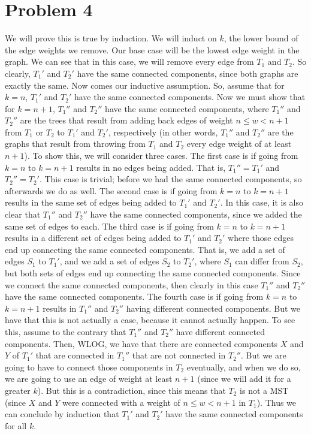\documentclass{article}
\begin{document}
\section*{Problem 4}
We will prove this is true by induction. We will induct on $k$, the lower
bound of the edge weights we remove. Our base case will be the lowest edge
weight in the graph. We can see that in this case, we will remove every
edge from $T_1$ and $T_2$. So clearly, $T_1'$ and $T_2'$ have the same
connected components, since both graphs are exactly the same. Now comes our
inductive assumption. So, assume that for $k = n$, $T_1'$ and $T_2'$ have
the same connected components. Now we must show that for $k = n+1$,
$T_1''$ and $T_2''$ have the same connected components, where $T_1''$ and
$T_2''$ are the trees that result from adding back edges of weight
$n \leq w < n+1$ from $T_1$ or $T_2$ to $T_1'$ and $T_2'$, respectively (in other
words, $T_1''$ and $T_2''$ are the graphs that result from throwing from
$T_1$ and $T_2$ every edge weight of at least $n+1$). To show this, we will
consider three cases. The first case is if going from $k=n$ to $k=n+1$ results
in no edges being added. That is, $T_1'' = T_1'$ and $T_2'' = T_2'$. This case
is trivial; before we had the same connected components, so afterwards we do
as well. The second case is if going from $k=n$ to $k=n+1$ results in the
same set of edges being added to $T_1'$ and $T_2'$. In this case, it is
also clear that $T_1''$ and $T_2''$ have the same connected components, since
we added the same set of edges to each. The third case is if going from $k=n$
to $k=n+1$ results in a different set of edges being added to $T_1'$ and
$T_2'$ where those edges end up connecting the same connected components. That is,
we add a set of edges $S_1$ to $T_1'$, and we add a set of edges $S_2$ to
$T_2'$, where $S_1$ can differ from $S_2$, but both sets of edges end up
connecting the same connected components. Since we connect the same connected
components, then clearly in this case $T_1''$ and $T_2''$ have the same connected
components. The fourth case is if going from $k=n$
to $k=n+1$ results in $T_1''$ and $T_2''$ having different connected components.
But we have that this is not actually a case, because it cannot actually happen.
To see this, assume to the contrary that $T_1''$ and $T_2''$ have different
connected components. Then, WLOG, we have that there are connected components
$X$ and $Y$ of $T_1'$ that are connected in $T_1''$ that are not connected in
$T_2''$. But we are going to have to connect those components in $T_2$
eventually, and when we do so, we are going to use an edge of weight at least
$n+1$ (since we will add it for a greater $k$). But this is a contradiction,
since this means that $T_2$ is not a MST (since $X$ and $Y$ were connected
with a weight of $n \leq w < n+1$ in $T_1$). Thus we can conclude by
induction that $T_1'$ and $T_2'$ have the same connected components for all
$k$.
\end{document}
